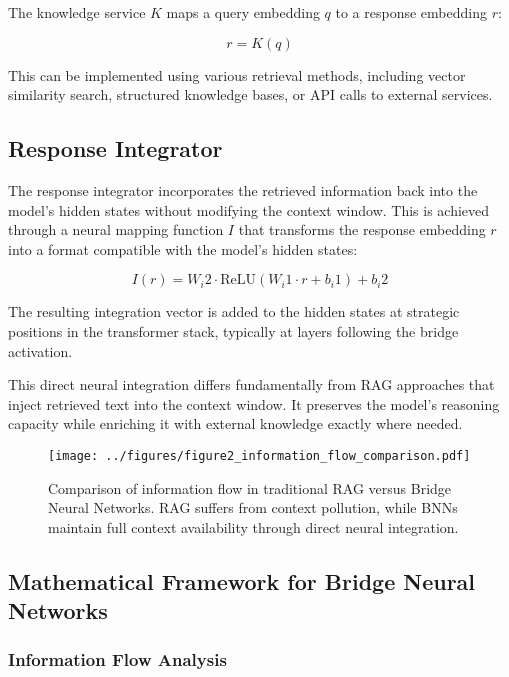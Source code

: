 \documentclass[9pt,a4paper,twocolumn,twoside]{tau-class/tau}
\begin{document}
    The knowledge service $K$ maps a query embedding $q$ to a response embedding $r$:

    \begin{equation}
        r = K(q)
    \end{equation}

    This can be implemented using various retrieval methods, including vector similarity search, structured knowledge bases, or API calls to external services.

\subsection{Response Integrator}

    The response integrator incorporates the retrieved information back into the model's hidden states without modifying the context window. This is achieved through a neural mapping function $I$ that transforms the response embedding $r$ into a format compatible with the model's hidden states:

    \begin{equation}
        I(r) = W_i2 \cdot \text{ReLU}(W_i1 \cdot r + b_i1) + b_i2
    \end{equation}

    The resulting integration vector is added to the hidden states at strategic positions in the transformer stack, typically at layers following the bridge activation.

    This direct neural integration differs fundamentally from RAG approaches that inject retrieved text into the context window. It preserves the model's reasoning capacity while enriching it with external knowledge exactly where needed.

    \begin{figure}[h]
        \centering
        \texttt{[image: ../figures/figure2\_information\_flow\_comparison.pdf]}
        \caption{Comparison of information flow in traditional RAG versus Bridge Neural Networks. RAG suffers from context pollution, while BNNs maintain full context availability through direct neural integration.}
        \label{fig:comparison}
    \end{figure}

\subsection{Mathematical Framework for Bridge Neural Networks}

\subsubsection{Information Flow Analysis}
\end{document}

